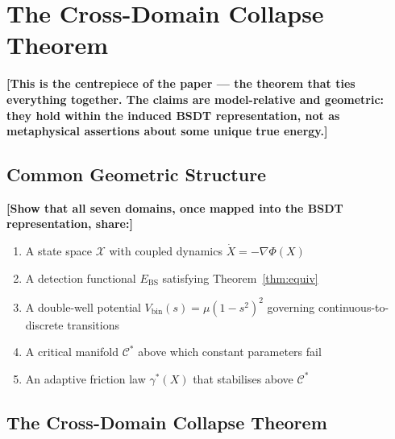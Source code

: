 \documentclass[11pt,a4paper]{article}
\newcommand{\Ebs}{E_{\mathrm{BS}}}
\newcommand{\Cman}{\mathcal{C}^*}
\newcommand{\grad}{\nabla}
\begin{document}
\section{The Cross-Domain Collapse Theorem}\label{sec:universal}

\textbf{[This is the centrepiece of the paper --- the theorem that
ties everything together.  The claims are model-relative and
geometric: they hold within the induced BSDT representation, not
as metaphysical assertions about some unique true energy.]}

\subsection{Common Geometric Structure}

\textbf{[Show that all seven domains, once mapped into the BSDT
representation, share:]}
\begin{enumerate}[nosep]
  \item A state space $\mathcal{X}$ with coupled dynamics
        $\dot{X} = -\grad\Phi(X)$
  \item A detection functional $\Ebs$ satisfying Theorem~\ref{thm:equiv}
  \item A double-well potential $V_{\mathrm{bin}}(s) = \mu(1-s^2)^2$
        governing continuous-to-discrete transitions
  \item A critical manifold $\Cman$ above which constant parameters fail
  \item An adaptive friction law $\gamma^*(X)$ that stabilises above $\Cman$
\end{enumerate}

\subsection{The Cross-Domain Collapse Theorem}
\end{document}
